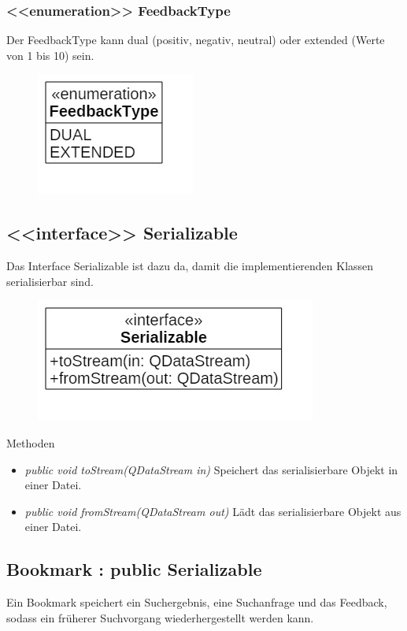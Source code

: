 \subsubsection*{<<enumeration>> FeedbackType}
Der FeedbackType kann dual (positiv, negativ, neutral) oder extended (Werte von 1 bis 10) sein.

\begin{figure}[H]
\centering
\includegraphics[scale=0.5]{img/Klassendiagramm/Klassen/FeedbackType}
\label{fig:feedbackType}
\end{figure}

\subsection*{<<interface>> Serializable}
Das Interface Serializable ist dazu da, damit die implementierenden Klassen serialisierbar sind.

\begin{figure}[H]
\centering
\includegraphics[scale=0.5]{img/Klassendiagramm/Klassen/Serializable}
\label{fig:serializable}
\end{figure}

Methoden
\begin{itemize}
\item \textit{public void toStream(QDataStream in)} Speichert das serialisierbare Objekt in einer Datei.
\item \textit{public void fromStream(QDataStream out)} Lädt das serialisierbare Objekt aus einer Datei.
\end{itemize}

\subsection*{Bookmark : public Serializable}
Ein Bookmark speichert ein Suchergebnis, eine Suchanfrage und das Feedback, sodass ein früherer Suchvorgang wiederhergestellt werden kann.

